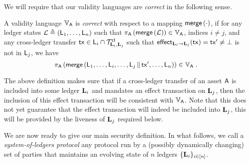 
We will require that our validity languages are \emph{correct} in the following
sense.

\begin{definition}
  \label{def:correctness}
  A validity language $\ValLang_{\Asset}$ is \emph{correct}
  with respect to
      a mapping $\merge\left(\cdot\right)$,
if
  for any ledger states
  $\mathcal{L}\defeq(\LState_1, \ldots, \LState_n)$
  such that
  $
    \proj_{\Asset}\left(
      \merge\left(
       \mathcal{L}
      \right)
    \right)
    \in \ValLang_{\Asset}
  $,
indices $i \neq j$,
and any cross-ledger transfer %
$\tx\in\LState_i\cap\Trans_{\Ledger_i,\Ledger_j}^\cl$
such that  %
  $\eff{\Ledger_i}{\Ledger_j}(\tx)=\tx'\neq\noeffect$
  is not in $\LState_j$,
we have
$$
  \proj_{\Asset}\left(
    \merge\left(
      \LState_1, \ldots, \LState_i, \ldots,
      \LState_j\concat\tx',
      \ldots, \LState_n
      \right)
  \right)
\in \ValLang_{\Asset}
\; .
$$
\end{definition}

The above definition makes sure that if a cross-ledger transfer of an asset
$\Asset$  is included into
some ledger $\Ledger_i$ and mandates an effect transaction on $\Ledger_j$, then
the inclusion of this effect transaction will be consistent with
$\ValLang_\Asset$. Note that this does not yet guarantee that the effect
transaction will indeed be included into $\Ledger_j$, this will be provided by
the liveness of $\Ledger_j$ required below.


We are now ready to give our main security definition.
In what follows, we call a \emph{system-of-ledgers protocol} any protocol run by a
(possibly dynamically changing) set of parties that maintains an evolving state
of $n$ ledgers $\{\Ledger_i\}_{i\in[n]}$.

